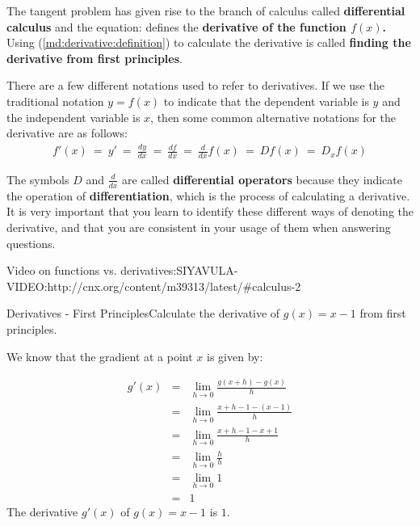 The tangent problem has given rise to the branch of calculus called \textbf{differential calculus} and the equation:
defines the \textbf{derivative of the function $f(x)$.} Using (\ref{md:derivative:definition}) to calculate the derivative is called \textbf{finding the derivative from first principles}. 


There are a few different notations used to refer to derivatives. If we use the traditional notation $y=f(x)$ to indicate that the dependent variable is $y$ and the independent variable is $x$, then some common alternative notations for the derivative are as follows:
\begin{eqnarray*}
f'(x)\ =\ y'\ =\ \frac{dy}{dx}\ =\ \frac{df}{dx}\ =\ \frac{d}{dx}f(x)\ =\ Df(x)\ =\ D_{x}f(x)
\label{md:lim:not:eq}
\end{eqnarray*}

The symbols $D$ and $\frac{d}{dx}$ are called {\bf differential operators} because they indicate the operation of \textbf{differentiation}, which is the process of calculating a derivative. It is very important that you learn to identify these different ways of denoting the derivative, and that you are consistent in your usage of them when answering questions.


Video on functions vs. derivatives:SIYAVULA-VIDEO:http://cnx.org/content/m39313/latest/#calculus-2
\begin{wex}
{Derivatives - First Principles}{Calculate the derivative of $g(x)=x-1$ from first principles.}{
We know that the gradient at a point $x$ is given by:


\begin{eqnarray*}
g'(x)&=&\lim_{h \to 0}\frac{g(x+h)-g(x)}{h}\\
&=&\lim_{h \to 0}\frac{x+h-1 - (x-1)}{h}\\
&=&\lim_{h \to 0}\frac{x+h-1-x+1}{h}\\
&=&\lim_{h \to 0}\frac{h}{h}\\
&=&\lim_{h \to 0}1\\
&=&1
\end{eqnarray*}
The derivative $g'(x)$ of $g(x)=x-1$ is $1$.}
\end{wex}


